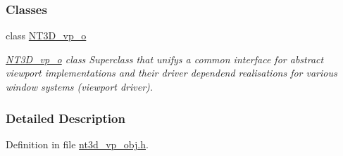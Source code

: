 \subsubsection*{Classes}
\begin{DoxyCompactItemize}
\item 
class \hyperlink{class_n_t3_d__vp__o}{NT3D\_\-vp\_\-o}
\begin{DoxyCompactList}\small\item\em \hyperlink{class_n_t3_d__vp__o}{NT3D\_\-vp\_\-o} class Superclass that unifys a common interface for abstract viewport implementations and their driver dependend realisations for various window systems (viewport driver). \item\end{DoxyCompactList}\end{DoxyCompactItemize}


\subsubsection{Detailed Description}


Definition in file \hyperlink{nt3d__vp__obj_8h_source}{nt3d\_\-vp\_\-obj.h}.

